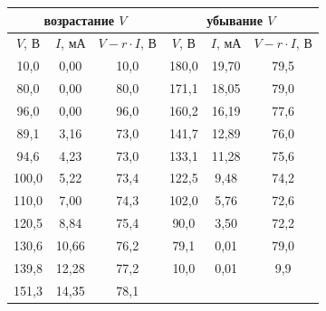 \documentclass[a4paper, 12pt]{article}%
\begin{document}
\begin{table}[ht]
\begin{center}
\begin{tabular}{|c|c|c|ccc}
\hline
\multicolumn{3}{|c|}{возрастание $V$} & \multicolumn{3}{c|}{убывание $V$}                                                                    \\ \hline
$V$, В & $I$, мА & $V - r \cdot I$, В & \multicolumn{1}{c|}{$V$, В} & \multicolumn{1}{c|}{$I$, мА} & \multicolumn{1}{c|}{$V - r \cdot I$, В} \\ \hline
10,0   & 0,00    & 10,0               & \multicolumn{1}{c|}{180,0}  & \multicolumn{1}{c|}{19,70}   & \multicolumn{1}{c|}{79,5}               \\ \hline
80,0   & 0,00    & 80,0               & \multicolumn{1}{c|}{171,1}  & \multicolumn{1}{c|}{18,05}   & \multicolumn{1}{c|}{79,0}               \\ \hline
96,0   & 0,00    & 96,0               & \multicolumn{1}{c|}{160,2}  & \multicolumn{1}{c|}{16,19}   & \multicolumn{1}{c|}{77,6}               \\ \hline
89,1   & 3,16    & 73,0               & \multicolumn{1}{c|}{141,7}  & \multicolumn{1}{c|}{12,89}   & \multicolumn{1}{c|}{76,0}               \\ \hline
94,6   & 4,23    & 73,0               & \multicolumn{1}{c|}{133,1}  & \multicolumn{1}{c|}{11,28}   & \multicolumn{1}{c|}{75,6}               \\ \hline
100,0  & 5,22    & 73,4               & \multicolumn{1}{c|}{122,5}  & \multicolumn{1}{c|}{9,48}    & \multicolumn{1}{c|}{74,2}               \\ \hline
110,0  & 7,00    & 74,3               & \multicolumn{1}{c|}{102,0}  & \multicolumn{1}{c|}{5,76}    & \multicolumn{1}{c|}{72,6}               \\ \hline
120,5  & 8,84    & 75,4               & \multicolumn{1}{c|}{90,0}   & \multicolumn{1}{c|}{3,50}    & \multicolumn{1}{c|}{72,2}               \\ \hline
130,6  & 10,66   & 76,2               & \multicolumn{1}{c|}{79,1}   & \multicolumn{1}{c|}{0,01}    & \multicolumn{1}{c|}{79,0}               \\ \hline
139,8  & 12,28   & 77,2               & \multicolumn{1}{c|}{10,0}   & \multicolumn{1}{c|}{0,01}    & \multicolumn{1}{c|}{9,9}                \\ \hline
151,3  & 14,35   & 78,1               &                             &                              &                                         \\ \cline{1-3}

\end{tabular}
\end{center}
\end{table}
\end{document}
